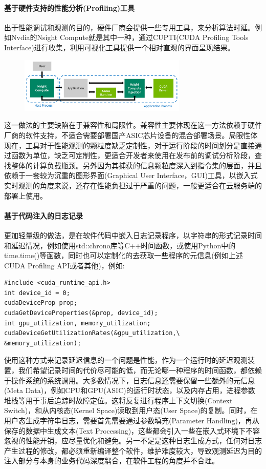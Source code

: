 \documentclass[master]{shtthesis}
\begin{document}
\paragraph{基于硬件支持的性能分析(Profiling)工具}

出于性能调试和观测的目的，硬件厂商会提供一些专用工具，来分析算法时延。例如Nvdia的Nsight Compute\cite{yang2020hierarchical}就是其中一种，通过CUPTI(CUDA Profiling Tools Interface)进行收集，利用可视化工具提供一个相对直观的界面呈现结果。

\begin{figure}[htbp]
	\centering
	\includegraphics[width=8cm]{img/nsight.png}
	\label{NsightCompute的观测原理}
\end{figure}


这一做法的主要缺陷在于兼容性和局限性。兼容性主要体现在这一方法依赖于硬件厂商的软件支持，不适合需要部署国产ASIC芯片设备的混合部署场景。局限性体现在，工具对于性能观测的颗粒度缺乏定制性，对于运行阶段的时间划分是直接通过函数为单位，缺乏可定制性，更适合开发者来使用在发布前的调试分析阶段，查找整体的计算负载瓶颈。另外因为其捕获的信息颗粒度深入到指令集的层面，并且依赖于一套较为沉重的图形界面(Graphical User Interface，GUI)工具，以嵌入式实时观测的角度来说，还存在性能负担过于严重的问题，一般更适合在云服务端的部署上使用。

\paragraph{基于代码注入的日志记录}
更加轻量级的做法，是在软件代码中嵌入日志记录程序，以字符串的形式记录时间和延迟情况，例如使用std::chrono库等C++时间函数，或使用Python中的time.time()等函数，同时也可以定制化的去获取一些程序的元信息(例如上述CUDA Profiling API或者其他)，例如:
\begin{lstlisting}
#include <cuda_runtime_api.h>
int device_id = 0;
cudaDeviceProp prop;
cudaGetDeviceProperties(&prop, device_id);
int gpu_utilization, memory_utilization;
cudaDeviceGetUtilizationRates(&gpu_utilization,\
&memory_utilization);
\end{lstlisting}
使用这种方式来记录延迟信息的一个问题是性能，作为一个运行时的延迟观测装置，我们希望记录时间的代价尽可能的低，而无论哪一种程序的时间函数，都依赖于操作系统的系统调用。大多数情况下，日志信息还需要保留一些额外的元信息(Meta Data)，例如CPU和GPU(ASIC)的运行时状态，以及内存占用，进程参数堆栈等用于事后追踪时故障定位。这将反复进行程序上下文切换(Context Switch)，和从内核态(Kernel Space)读取到用户态(User Space)的复制。同时，在用户态生成字符串日志，需要首先需要通过参数填充(Parameter Handling)，再从保存的数据中生成文本(Text Processing)，这些都会引入一些在嵌入式环境下不容忽视的性能开销，应尽量优化和避免。另一不足是这种日志生成方式，任何对日志产生过程的修改，都必须重新编译整个软件，维护难度较大，导致观测延迟为目的注入部分与本身的业务代码深度耦合，在软件工程的角度并不合理。
\end{document}
